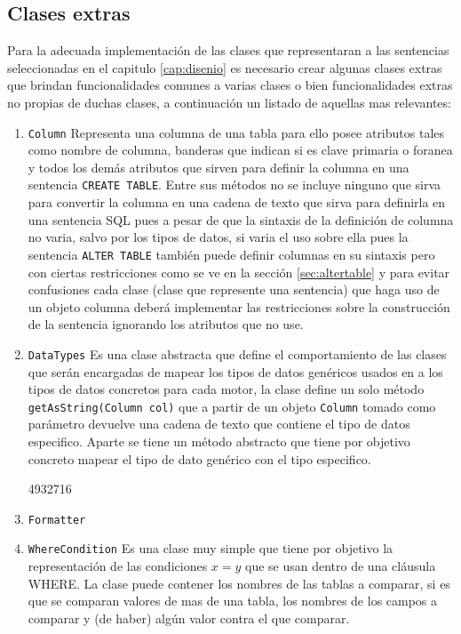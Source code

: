 \subsection{Clases extras}
Para la adecuada implementación de las clases que representaran a las sentencias seleccionadas en el capitulo \ref{cap:disenio} es necesario crear algunas clases extras que brindan funcionalidades comunes a varias clases o bien funcionalidades extras no propias de duchas clases, a continuación un listado de aquellas mas relevantes:
\begin{enumerate}
\item \verb=Column= Representa una columna de una tabla para ello posee atributos tales como nombre de columna, banderas que indican si es clave primaria o foranea y todos los demás atributos que sirven para definir la columna en una sentencia \verb=CREATE TABLE=. Entre sus métodos no se incluye ninguno que sirva para convertir la columna en una cadena  de texto que sirva para definirla en una sentencia SQL pues a pesar de que la sintaxis de la definición de columna no varia, salvo por los tipos de datos, si varia el uso sobre ella pues la sentencia \verb=ALTER TABLE= también puede definir columnas en su sintaxis pero con ciertas restricciones como se ve en la sección \ref{sec:altertable} y para evitar confusiones cada clase (clase que represente una sentencia) que haga uso de un objeto columna deberá implementar las restricciones sobre la construcción de la sentencia ignorando los atributos que no use. 

\item \verb=DataTypes= Es una clase abstracta que define el comportamiento de las clases que serán encargadas de mapear los tipos de datos genéricos usados en \cc a los tipos de datos concretos para cada motor, la clase define un solo método \verb=getAsString(Column col)= que a partir de un objeto \verb=Column= tomado como parámetro devuelve una cadena de texto que contiene el tipo de datos especifico. Aparte se tiene un método abstracto que tiene por objetivo concreto mapear el tipo de dato genérico con el tipo especifico.  

4932716
\item \verb=Formatter=

\item \verb=WhereCondition= Es una clase muy simple que tiene por objetivo la representación de las condiciones $ x = y $ que se usan dentro de una cláusula WHERE. La clase puede contener los nombres de las tablas a comparar, si es que se comparan valores de mas de una tabla, los nombres de los campos a comparar y (de haber) algún valor contra el que comparar.


\end{enumerate}

